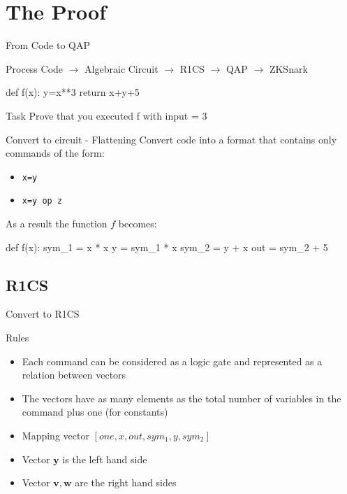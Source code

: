 \documentclass[handouts]{beamer}
\begin{document}
\section{The Proof}

\begin{frame}[fragile]{From Code to QAP}

\begin{block}{Process}
Code $\rightarrow$ Algebraic Circuit $\rightarrow$ R1CS 
$\rightarrow$ QAP $\rightarrow$ ZKSnark
\end{block}
\pause
\begin{python}
    def f(x): 
        y=x**3 
        return x+y+5   
\end{python}
\pause
\begin{block}{Task}
Prove that you executed f with input = $3$
\end{block}
\end{frame}

\begin{frame}[fragile]{Convert to circuit - Flattening}
    Convert code into a format that contains only commands of the form:
    \begin{itemize}
        \item \texttt{x=y}
        \item \texttt{x=y op z}  
    \end{itemize}
    \pause
    As a result the function $f$ becomes:    
   \begin{python}
        def f(x): 
            sym_1 = x * x 
            y = sym_1 * x    
            sym_2 = y + x   
            out = sym_2 + 5
    \end{python}    
\end{frame}

\subsection{R1CS}
\begin{frame}{Convert to R1CS} 
\begin{block}{Rules}
    \begin{itemize}
        \item Each command can be considered as a logic gate and represented as a relation between vectors \pause
        \item The vectors have as many elements as the total number of variables in the command plus one (for constants) \pause
        \item Mapping vector $ [ one,  x,  out,  sym_1,  y,  sym_2 ] $ \pause
        \item Vector $\bm{y}$ is the left hand side \pause
        \item Vector $\bm{v}, \bm{w}$ are the right hand sides \pause
    \end{itemize}  
\end{block}

\end{frame}
 
\end{document}
